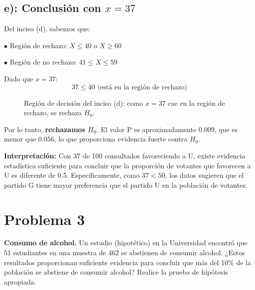 \documentclass[12pt]{article}
\begin{document}
\subsection*{e): Conclusión con $x = 37$}

Del inciso (d), sabemos que:

$\bullet$ Región de rechazo: $X \leq 40$ o $X \geq 60$

$\bullet$ Región de no rechazo: $41 \leq X \leq 59$

Dado que $x = 37$:
$$37 \leq 40 \text{ (está en la región de rechazo)}$$

\begin{figure}[H]
\centering
{}
\caption{Región de decisión del inciso (d): como $x=37$ cae en la región de rechazo, se rechaza $H_0$.}
\end{figure}


Por lo tanto, \textbf{rechazamos $H_0$}. El valor P es aproximadamente 0.009, 
que es menor que 0.056, lo que proporciona evidencia fuerte contra $H_0$.

\textbf{Interpretación:} Con 37 de 100 consultados favoreciendo a U, existe evidencia estadística suficiente para concluir que la proporción de votantes que favorecen a U es diferente de 0.5. Específicamente, como $37 < 50$, los datos sugieren que el partido G tiene mayor preferencia que el partido U en la población de votantes.



\section*{Problema 3}
\textbf{Consumo de alcohol.} Un estudio (hipotético) en la Universidad encontró que 51 estudiantes en una muestra de 462 se abstienen de consumir alcohol. ¿Estos resultados proporcionan suficiente evidencia para concluir que más del 10\% de la población se abstiene de consumir alcohol? Realice la prueba de hipótesis apropiada.
\end{document}
